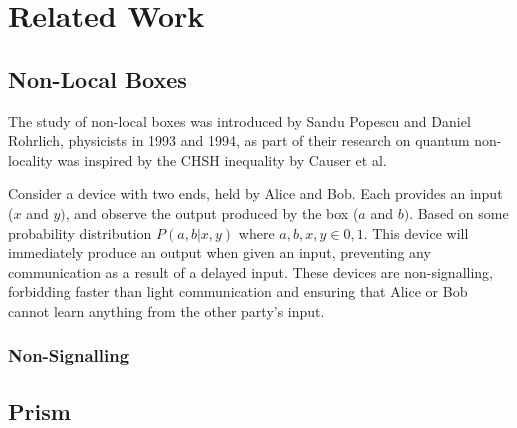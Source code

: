 \documentclass[report.tex]{subfiles}
\begin{document}
\chapter{Related Work} %
\label{cha:related_work}


\section{Non-Local Boxes} %
\label{sec:non_local_boxes}
The study of non-local boxes was introduced by Sandu Popescu and Daniel
Rohrlich, physicists in 1993 and 1994, as part of their research on quantum
non-locality was inspired by the CHSH inequality by Causer et al.

Consider a device with two ends, held by Alice and Bob. Each provides an
input (\(x\) and \(y)\), and observe the output produced by the box (\(a\) and
\(b)\). Based on some probability distribution \(P(a,b | x,y)\) where \(a, b, x,
y \in {0, 1}\). This device will immediately produce an output when given an
input, preventing any communication as a result of a delayed input. These
devices are non-signalling, forbidding faster than light communication and
ensuring that Alice or Bob cannot learn anything from the other party's input.

\subsection{Non-Signalling} %
\label{sub:non_signalling}



\section{Prism} %
\label{sec:prism}

\newpage
\end{document}
